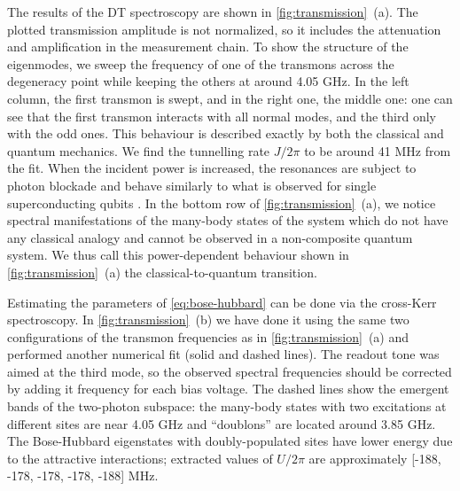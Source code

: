 \documentclass[%
 aps, pra,
 amsmath,amssymb,
 reprint,%
superscriptaddress
]{revtex4-2}
\begin{document}
The results of the DT spectroscopy are shown in \autoref{fig:transmission}~(a). The plotted transmission amplitude is not normalized, so it includes the attenuation and amplification in the measurement chain. To show the structure of the eigenmodes, we sweep the frequency of one of the transmons across the degeneracy point while keeping the others at around 4.05 GHz. In the left column, the first transmon is swept, and in the right one, the middle one: one can see that the first transmon interacts with all normal modes, and the third only with the odd ones. This behaviour is described exactly by both the classical and quantum mechanics. We find the tunnelling rate $J/2\pi$ to be around 41 MHz from the fit. When the incident power is increased, the resonances are subject to photon blockade \cite{birnbaum2005photon} and behave similarly to what is observed for single superconducting qubits \cite{astafiev2010resonance}. In the bottom row of \autoref{fig:transmission}~(a), we notice spectral manifestations of the many-body states of the system which do not have any classical analogy and cannot be observed in a non-composite quantum system. We thus call this power-dependent behaviour shown in \autoref{fig:transmission}~(a) the classical-to-quantum transition. 


Estimating the parameters of \eqref{eq:bose-hubbard} can be done via the cross-Kerr spectroscopy. In \autoref{fig:transmission}~(b) we have done it using the same two configurations of the transmon frequencies as in \autoref{fig:transmission}~(a) and performed another numerical fit (solid and dashed lines). The readout tone was aimed at the third mode, so the observed spectral frequencies should be corrected by adding it frequency for each bias voltage. The dashed lines show the emergent bands of the two-photon subspace: the many-body states with two excitations at different sites are near 4.05 GHz and ``doublons'' \cite{gorlach2018simulation} are located around 3.85 GHz. The Bose-Hubbard eigenstates with doubly-populated sites have lower energy due to the attractive interactions; extracted values of $U/2\pi$ are approximately [-188, -178, -178, -178, -188] MHz. 
\end{document}
